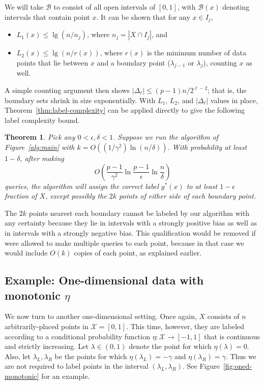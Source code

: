 \documentclass{article}
\def\X{{\mathcal X}}
\def\B{{\mathcal B}}
\newtheorem{thm}{Theorem}
\begin{document}
We will take $\B$ to consist of all open intervals of $[0,1]$, with $\B(x)$ denoting intervals that contain point $x$. It can be shown that for any $x \in I_j$,
\begin{itemize}
\item $L_1(x) \leq \lg (n/n_j)$, where $n_j = |X \cap I_j|$, and
\item $L_2(x) \leq \lg (n/r(x))$, where $r(x)$ is the minimum number of data points that lie between $x$ and a boundary point ($\lambda_{j-1}$ or $\lambda_j$), counting $x$ as well.
\end{itemize}
A simple counting argument then shows $|\Delta_\ell| \leq (p-1)n/2^{\ell-2}$; that is, the boundary sets shrink in size exponentially. With $L_1$, $L_2$, and $|\Delta_\ell|$ values in place, Theorem~\ref{thm:label-complexity} can be applied directly to give the following label complexity bound.

\begin{thm}
Pick any $0 < \epsilon, \delta < 1$. Suppose we run the algorithm of Figure~\ref{alg:main} with $k = O((1/\gamma^2) \ln (n/\delta))$. With probability at least $1-\delta$, after making
$$ O \left( \frac{p-1}{\gamma^2} \ln \frac{p-1}{\epsilon} \ln \frac{n}{\delta} \right) $$
queries, the algorithm will assign the correct label $g^*(x)$ to at least $1-\epsilon$ fraction of $X$, except possibly the $2k$ points of either side of each boundary point.
\label{thm:oned-massart}
\end{thm}

The $2k$ points nearest each boundary cannot be labeled by our algorithm with any certainty because they lie in intervals with a strongly positive bias as well as in intervals with a strongly negative bias. This qualification would be removed if were allowed to make multiple queries to each point, because in that case we would include $O(k)$ copies of each point, as explained earlier.

\subsection{Example: One-dimensional data with monotonic $\eta$}

We now turn to another one-dimensional setting. Once again, $X$ consists of $n$ arbitrarily-placed points in $\X = [0,1]$. This time, however, they are labeled according to a conditional probability function $\eta: \X \to [-1,1]$ that is continuous and strictly increasing. Let $\lambda \in (0,1)$ denote the point for which $\eta(\lambda) = 0$. Also, let $\lambda_L, \lambda_R$ be the points for which $\eta(\lambda_L) = -\gamma$ and $\eta(\lambda_R) = \gamma$. Thus we are not required to label points in the interval $(\lambda_L, \lambda_R)$. See Figure~\ref{fig:oned-monotonic} for an example.
\end{document}
